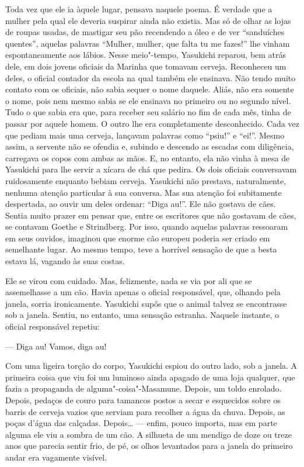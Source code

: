 Toda vez que ele ia àquele lugar, pensava naquele poema. É verdade que a
mulher pela qual ele deveria suspirar ainda não existia. Mas só de
olhar as lojas de roupas usadas, de mastigar seu pão recendendo a óleo
e de ver ``sanduíches quentes'', aquelas palavras ``Mulher,
mulher, que falta tu me fazes!'' lhe vinham espontaneamente aos lábios.
Nesse meio"-tempo, Yasukichi reparou, bem atrás dele, em dois jovens
oficiais da Marinha que tomavam cerveja. Reconheceu um deles, o oficial
contador da escola na qual também ele ensinava. Não tendo muito contato
com os oficiais, não sabia sequer o nome daquele. Aliás, não era
somente o nome, pois nem mesmo sabia se ele ensinava no primeiro ou no
segundo nível. Tudo o que sabia era que, para receber seu salário no
fim de cada mês, tinha de passar por aquele homem. O outro lhe era
completamente desconhecido. Cada vez que pediam mais uma cerveja,
lançavam palavras como ``psiu!'' e ``ei!''. Mesmo assim, a servente não se
ofendia e, subindo e descendo as escadas com diligência, carregava os
copos com ambas as mãos. E, no entanto, ela não vinha à mesa de
Yasukichi para lhe servir a xícara de chá que pedira. Os dois oficiais
conversavam ruidosamente enquanto bebiam cerveja. Yasukichi não
prestava, naturalmente, nenhuma atenção particular à sua conversa. Mas
sua atenção foi subitamente despertada, ao ouvir um deles ordenar:
``Diga au!''. Ele não gostava de cães. Sentia muito prazer em pensar que,
entre os escritores que não gostavam de cães, se contavam Goethe e
Strindberg. Por isso, quando aquelas palavras ressoaram em seus
ouvidos, imaginou que enorme cão europeu poderia ser criado em
semelhante lugar. Ao mesmo tempo, teve a horrível sensação de que a
besta estava lá, vagando às suas costas.

Ele se virou com cuidado. Mas, felizmente, nada se via por ali que se
assemelhasse a um cão. Havia apenas o oficial responsável, que, olhando
pela janela, sorria ironicamente. Yasukichi supôs que o animal talvez
se encontrasse sob a janela. Sentiu, no entanto, uma sensação estranha.
Naquele instante, o oficial responsável repetiu:

--- Diga au! Vamos, diga au!

Com uma ligeira torção do corpo, Yasukichi espiou do outro lado, sob a
janela. A primeira coisa que viu foi um luminoso ainda apagado de uma
loja qualquer, que fazia a propaganda de alguma"-coisa"-Masamune. Depois,
um toldo enrolado. Depois, pedaços de couro para tamancos postos a
secar e esquecidos sobre os barris de cerveja vazios que serviam para
recolher a água da chuva. Depois, as poças d'água das calçadas.
Depois\ldots{} --- enfim, pouco importa, mas em parte alguma ele viu a sombra
de um cão. A silhueta de um mendigo de doze ou treze anos que parecia
sentir frio, de pé, os olhos levantados para a janela do primeiro andar
era vagamente visível.


